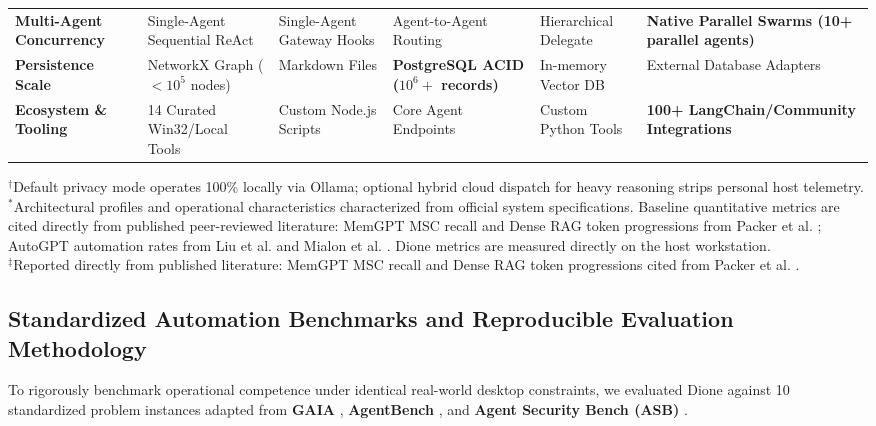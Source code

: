 \documentclass[conference,a4paper]{IEEEtran}
\begin{document}
\begin{table}[!t]
\begin{tabularx}{\textwidth}{lXXXXX}
\textbf{Multi-Agent Concurrency} & Single-Agent Sequential ReAct & Single-Agent Gateway Hooks & Agent-to-Agent Routing & Hierarchical Delegate & \textbf{Native Parallel Swarms (10+ parallel agents)} \\
\textbf{Persistence Scale} & NetworkX Graph ($<10^5$ nodes) & Markdown Files & \textbf{PostgreSQL ACID ($10^6+$ records)} & In-memory Vector DB & External Database Adapters \\
\textbf{Ecosystem \& Tooling} & 14 Curated Win32/Local Tools & Custom Node.js Scripts & Core Agent Endpoints & Custom Python Tools & \textbf{100+ LangChain/Community Integrations} \\
\bottomrule
\end{tabularx}
\begin{flushleft}
\footnotesize
$^\dagger$Default privacy mode operates 100\% locally via Ollama; optional hybrid cloud dispatch for heavy reasoning strips personal host telemetry.\\
$^*$Architectural profiles and operational characteristics characterized from official system specifications. Baseline quantitative metrics are cited directly from published peer-reviewed literature: MemGPT MSC recall and Dense RAG token progressions from Packer et al. \cite{packer2023memgpt}; AutoGPT automation rates from Liu et al. \cite{liu2023agentbench} and Mialon et al. \cite{mialon2023gaia}. Dione metrics are measured directly on the host workstation.\\
$^\ddagger$Reported directly from published literature: MemGPT MSC recall and Dense RAG token progressions cited from Packer et al. \cite{packer2023memgpt}.
\end{flushleft}
\end{table}

\subsection{Standardized Automation Benchmarks and Reproducible Evaluation Methodology}
To rigorously benchmark operational competence under identical real-world desktop constraints, we evaluated Dione against 10 standardized problem instances adapted from \textbf{GAIA} \cite{mialon2023gaia}, \textbf{AgentBench} \cite{liu2023agentbench}, and \textbf{Agent Security Bench (ASB)} \cite{zhang2024agent}.
\end{document}
